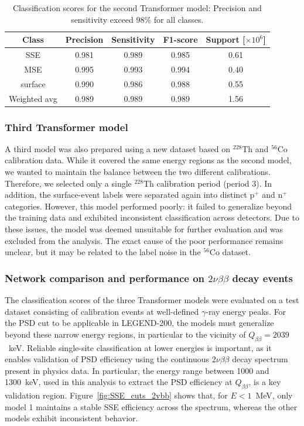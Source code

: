 \begin{table}
\centering
\caption{Classification scores for the second Transformer model: Precision and sensitivity exceed 98\% for all classes.}
\begin{tabular}{||c | c | c | c | c||} 
 \hline
 \textbf{Class} & \textbf{Precision} & \textbf{Sensitivity} & \textbf{F1-score} & \textbf{Support} [$\times 10^6$] \\ 
 \hline
 SSE & 0.981 & 0.989 & 0.985 & 0.61 \\
 \hline
 MSE & 0.995 & 0.993 & 0.994 & 0.40 \\
  \hline
 surface & 0.990 & 0.986 & 0.988 & 0.55 \\
 \hline
 Weighted avg & 0.989 & 0.989 & 0.989 & 1.56 \\ 
 \hline
\end{tabular}
\label{tab:Scores_icpc_v2}
\end{table}



\subsubsection{Third Transformer model}

A third model was also prepared using a new dataset based on $^{228}$Th and $^{56}$Co calibration data. While it covered the same energy regions as the second model, we wanted to maintain the balance between the two different calibrations. Therefore, we selected only a single $^{228}$Th calibration period (period 3). In addition, the surface-event labels were separated again into distinct p$^+$ and n$^+$ categories. 
However, this model performed poorly: it failed to generalize beyond the training data and exhibited inconsistent classification across detectors. Due to these issues, the model was deemed unsuitable for further evaluation and was excluded from the analysis. The exact cause of the poor performance remains unclear, but it may be related to the label noise in the $^{56}$Co dataset. 


\subsubsection{Network comparison and performance on \texorpdfstring{$2 \nu \beta \beta$ decay events}{}}

The classification scores of the three Transformer models were evaluated on a test dataset consisting of calibration events at well-defined $\gamma$-ray energy peaks. For the PSD cut to be applicable in LEGEND-200, the models must generalize beyond these narrow energy regions, in particular to the vicinity of $Q_{\beta \beta} = 2039$~keV. Reliable single-site classification at lower energies is important, as it enables validation of PSD efficiency using the continuous $2 \nu \beta \beta$ decay spectrum present in physics data. In particular, the energy range between 1000 and 1300~keV, used in this analysis to extract the PSD efficiency at $Q_{\beta \beta}$, is a key validation region. Figure~\ref{fig:SSE_cuts_2vbb} shows that, for $E < 1$~MeV, only model 1 maintains a stable SSE efficiency across the spectrum, whereas the other models exhibit inconsistent behavior.  



